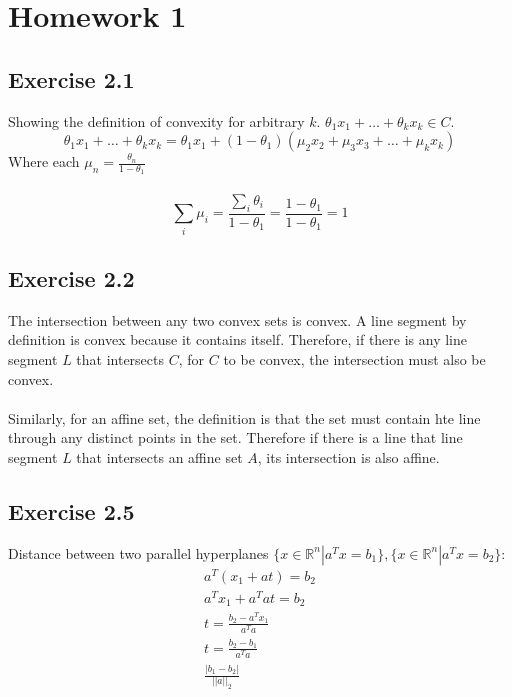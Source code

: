 \section{Homework 1}

\subsection{Exercise 2.1}
Showing the definition of convexity for arbitrary $k$. $\theta_1 x_1 + \dots + \theta_k x_k \in C$.
\begin{equation}
  \theta_1 x_1 + \dots + \theta_k x_k = \theta_1 x_1 + (1-\theta_1)(\mu_2 x_2 + \mu_3 x_3 + \dots + \mu_k x_k)
\end{equation}
Where each $\mu_n = \frac{\theta_n}{1-\theta_1}$
\\ \\ 
\begin{equation}
  \sum_i \mu_i = \frac{\sum_i \theta_i}{1-\theta_1} = \frac{1-\theta_1}{1-\theta_1} = 1
\end{equation}
\subsection{Exercise 2.2}
The intersection between any two convex sets is convex. A line segment by definition is convex because it contains itself. Therefore, if there is any line segment $L$ that intersects $C$, for $C$ to be convex, the intersection must also be convex.
\\ \\ 
Similarly, for an affine set, the definition is that the set must contain hte line through any distinct points in the set. Therefore if there is a line that line segment $L$ that intersects an affine set $A$, its intersection is also affine.
\subsection{Exercise 2.5}
Distance between two parallel hyperplanes $\{x \in \mathbb{R}^n | a^T x = b_1 \}, \{x \in \mathbb{R}^n | a^T x = b_2\}$:
\begin{gather}
  a^T(x_1+ at) = b_2 \\
  a^Tx_1 + a^Tat = b_2 \\
  t = \frac{b_2-a^Tx_1}{a^Ta} \\
  t = \frac{b_2 - b_1}{a^Ta} \\
  \frac{|b_1 - b_2|}{||a||_2}
\end{gather}
